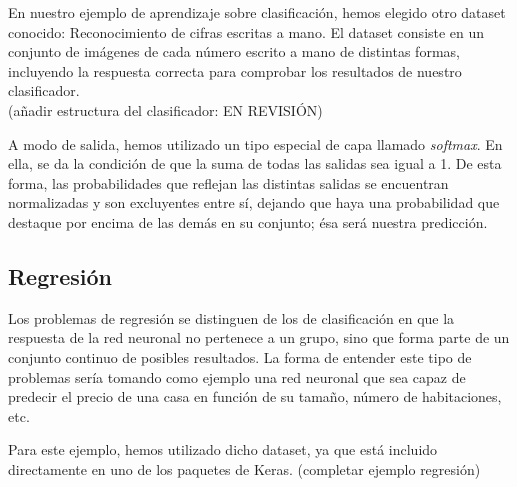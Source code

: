En nuestro ejemplo de aprendizaje sobre clasificación, hemos elegido otro dataset conocido: Reconocimiento de cifras escritas a mano. El dataset consiste en un conjunto de imágenes de cada número escrito a mano de distintas formas, incluyendo la respuesta correcta para comprobar los resultados de nuestro clasificador. \\ 

(añadir estructura del clasificador: EN REVISIÓN)

A modo de salida, hemos utilizado un tipo especial de capa llamado \textit{softmax}. En ella, se da la condición de que la suma de todas las salidas sea igual a 1. De esta forma, las probabilidades que reflejan las distintas salidas se encuentran normalizadas y son excluyentes entre sí, dejando que haya una probabilidad que destaque por encima de las demás en su conjunto; ésa será nuestra predicción. 


\subsection{Regresión}
Los problemas de regresión se distinguen de los de clasificación en que la respuesta de la red neuronal no pertenece a un grupo, sino que forma parte de un conjunto continuo de posibles resultados. La forma de entender este tipo de problemas sería tomando como ejemplo una red neuronal que sea capaz de predecir el precio de una casa en función de su tamaño, número de habitaciones, etc. 

Para este ejemplo, hemos utilizado dicho dataset, ya que está incluido directamente en uno de los paquetes de Keras. 
(completar ejemplo regresión)

